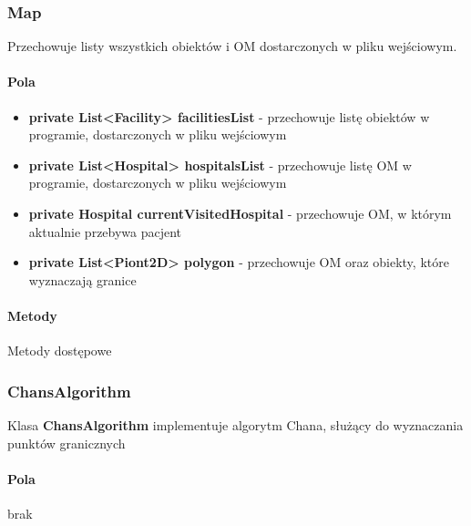 \documentclass[]{article}
\begin{document}
            \subsubsection{Map}
                    Przechowuje listy wszystkich obiektów i OM dostarczonych w pliku wejściowym.
                \paragraph{Pola}
                    \begin{itemize}
                        \item \textbf{private List<Facility> facilitiesList} - przechowuje listę obiektów w programie, dostarczonych w pliku wejściowym 
                        \item \textbf{private List<Hospital> hospitalsList} - przechowuje listę OM w programie, dostarczonych w pliku wejściowym
                        \item \textbf{private Hospital currentVisitedHospital} - przechowuje OM, w którym aktualnie przebywa pacjent
                        \item \textbf{private List<Piont2D> polygon} - przechowuje OM oraz obiekty, które wyznaczają granice
                    \end{itemize}
            
                \paragraph{Metody}
                    Metody dostępowe
        
        \subsubsection{ChansAlgorithm}
                Klasa \textbf{ChansAlgorithm} implementuje algorytm Chana, służący do wyznaczania punktów granicznych
                \paragraph{Pola}
                    brak
\end{document}
